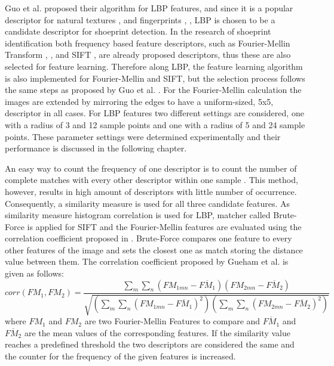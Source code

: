 \documentclass[draft,final]{vutinfth} %
\begin{document}
\par
Guo et al. \cite{guo2012discriminative} proposed their algorithm for LBP features, and since it is a popular descriptor for natural textures \cite{hong2014combining}, \cite{ahonen2009rotation} and fingerprints \cite{wang2013pixel}, \cite{rida2018palmprint}, LBP is chosen to be a candidate descriptor for shoeprint detection.
In the research of shoeprint identification both frequency based feature descriptors, such as Fourier-Mellin Transform \cite{wu2019crime}, \cite{gueham2008automatic}, and SIFT \cite{nibouche2009rotation}, \cite{richetelli2017classification} are already proposed descriptors, thus these are also selected for feature learning.
Therefore along LBP, the feature learning algorithm is also implemented for Fourier-Mellin and SIFT, but the selection process follows the same steps as proposed by Guo et al. \cite{guo2012discriminative}.
For the Fourier-Mellin calculation the images are extended by mirroring the edges to have a uniform-sized, 5x5, descriptor in all cases.
For LBP features two different settings are considered, one with a radius of 3 and 12 sample points and one with a radius of 5 and 24 sample points.
These parameter settings were determined experimentally and their performance is discussed in the following chapter.
\par
An easy way to count the frequency  of one descriptor is to count the number of complete matches with every other descriptor within one sample .
This method, however, results in high amount of descriptors with little number of occurrence.
Consequently, a similarity measure is used for all three candidate features. 
As similarity measure histogram correlation is used for LBP, matcher called Brute-Force is applied for SIFT and the Fourier-Mellin features are evaluated using the correlation coefficient proposed  in \cite{gueham2008automatic}.
Brute-Force compares one feature to every other features of the image and sets the closest one as match storing the distance value between them.
The correlation coefficient proposed by Gueham et al. \cite{gueham2008automatic} is given as follows:
\[ corr(FM_{1},FM_{2}) = \frac{\sum\limits_{m}\sum\limits_{n}(FM_{1mn}-\overline{FM_{1}})(FM_{2mn}-\overline{FM_{2}})}{\sqrt{(\sum\limits_{m}\sum\limits_{n}(FM_{1mn}-\overline{FM_{1}})^2)(\sum\limits_{m}\sum\limits_{n}(FM_{2mn}-\overline{FM_{2}})^2)}}  \]
\label{FMcorr}
where $FM_{1}$ and $FM_{2}$ are two Fourier-Mellin Features to compare and $\overline{FM_{1}}$ and $\overline{FM_{2}}$ are the mean values of the corresponding features.
If the similarity value reaches a predefined threshold the two descriptors are considered the same and the counter for the frequency of the given features is increased.
\end{document}
